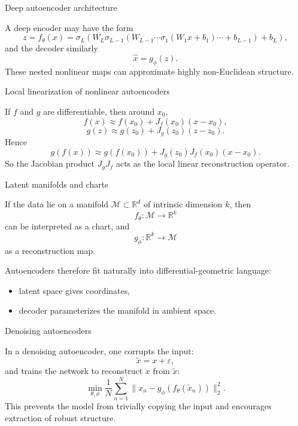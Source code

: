 \documentclass[aspectratio=169]{beamer}
\begin{document}
\begin{frame}{Deep autoencoder architecture}

A deep encoder may have the form
\[
z = f_\theta(x)=\sigma_L(W_L \sigma_{L-1}(W_{L-1}\cdots \sigma_1(W_1 x+b_1)\cdots+b_{L-1})+b_L),
\]
and the decoder similarly
\[
\hat x = g_\phi(z).
\]
These nested nonlinear maps can approximate highly non-Euclidean structure.

\end{frame}

\begin{frame}{Local linearization of nonlinear autoencoders}

If \(f\) and \(g\) are differentiable, then around \(x_0\),
\[
f(x) \approx f(x_0)+J_f(x_0)(x-x_0),
\]
\[
g(z) \approx g(z_0)+J_g(z_0)(z-z_0).
\]
Hence
\[
g(f(x)) \approx g(f(x_0)) + J_g(z_0)J_f(x_0)(x-x_0).
\]
So the Jacobian product \(J_g J_f\) acts as the local linear reconstruction operator.

\end{frame}

\begin{frame}{Latent manifolds and charts}

If the data lie on a manifold \(\mathcal{M}\subset\mathbb{R}^d\) of intrinsic dimension \(k\), then
\[
f_\theta : \mathcal{M}\to\mathbb{R}^k
\]
can be interpreted as a chart, and
\[
g_\phi : \mathbb{R}^k\to\mathcal{M}
\]
as a reconstruction map.

Autoencoders therefore fit naturally into differential-geometric language:
\begin{itemize}
\item latent space gives coordinates,
\item decoder parameterizes the manifold in ambient space.
\end{itemize}

\end{frame}

\begin{frame}{Denoising autoencoders}

In a denoising autoencoder, one corrupts the input:
\[
\tilde x = x + \varepsilon,
\]
and trains the network to reconstruct \(x\) from \(\tilde x\):
\[
\min_{\theta,\phi}\frac{1}{N}\sum_{n=1}^N \|x_n-g_\phi(f_\theta(\tilde x_n))\|_2^2.
\]
This prevents the model from trivially copying the input and encourages extraction of robust structure.

\end{frame}
\end{document}

